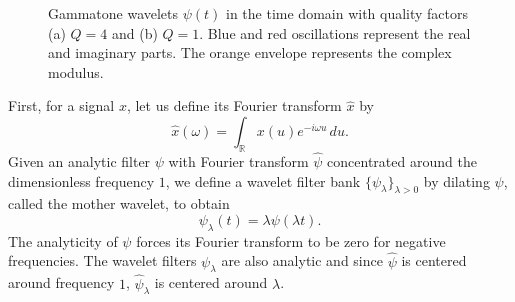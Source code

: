 \documentclass{article}
\newcommand{\la}{{\lambda}}
\begin{document}
\begin{sloppy}
\begin{figure}
\begin{center}
\caption{
\label{fig:gammatones}
Gammatone wavelets $\psi(t)$ in the time domain with quality factors (a) $Q = 4$ and (b) $Q = 1$. Blue and red oscillations represent the real and imaginary parts. The orange envelope represents the complex modulus.}
\end{center}
\end{figure}

First, for a signal $x$, let us define its Fourier transform $\widehat{x}$ by
\begin{equation}
	\widehat{x}(\omega) = \int_{\mathbb{R}} x(u) e^{-i\omega u}\,du.
\end{equation}
Given an analytic filter $\psi$ with Fourier transform $\widehat{\psi}$ concentrated around the dimensionless frequency $1$, we define a wavelet filter bank $\{\psi_\lambda\}_{\lambda>0}$ by dilating $\psi$, called the mother wavelet, to obtain
\begin{equation}
	\psi_\lambda(t) = \lambda \psi(\lambda t).
\end{equation}
The analyticity of $\psi$ forces its Fourier transform to be zero for negative frequencies. The wavelet filters $\psi_\lambda$ are also analytic and since $\widehat{\psi}$ is centered around frequency $1$, $\widehat{\psi}_\la$ is centered around $\lambda$.


\end{sloppy}
\end{document}
